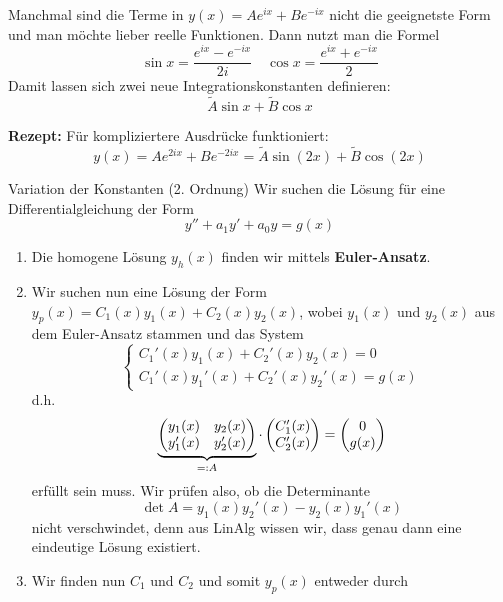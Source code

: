 \begin{Diverses}{}{}
	Manchmal sind die Terme in $y(x) = Ae^{ix} + Be^{-ix}$ nicht die geeignetste Form und man möchte lieber reelle Funktionen. Dann nutzt man die Formel 
	\[
		\sin x = \frac{e^{ix} - e^{-ix}}{2i} \quad
    	\cos x = \frac{e^{ix} + e^{-ix}}{2}
    \]
	Damit lassen sich zwei neue Integrationskonstanten definieren: \[\widetilde{A} \sin x + \widetilde{B} \cos x\]
	
	\textbf{Rezept:} Für kompliziertere Ausdrücke funktioniert:
	\[
	    y(x) = Ae^{2ix} + Be^{-2ix} = \widetilde{A} \sin (2x) + \widetilde{B} \cos (2x)
	\]
\end{Diverses}

\begin{Rezept}{Variation der Konstanten (2. Ordnung)}{}
	Wir suchen die Lösung für eine Differentialgleichung der Form
	\begin{equation*}
	y'' + a_1 y' + a_0 y = g(x)
	\end{equation*}
	\begin{enumerate}
		\item Die homogene Lösung $y_h(x)$ finden wir mittels \textbf{Euler-Ansatz}.
		\item Wir suchen nun eine Lösung der Form $y_p(x) = C_1(x) y_1(x) + C_2(x) y_2(x)$, wobei $y_1(x)$ und $y_2(x)$ aus dem Euler-Ansatz stammen und das System
		\begin{equation*}
		\begin{cases} C_1'(x)y_1(x) + C_2'(x)y_2(x)=0\\C_1'(x)y_1'(x) + C_2'(x)y_2'(x)=g(x)\end{cases}
		\end{equation*}
		d.h.
		\begin{equation*}
		\underbrace{\begin{pmatrix}
			y_1(x) &y_2(x)\\y_1'(x) &y_2'(x)
			\end{pmatrix}}_{=:A} \cdot \begin{pmatrix} C_1'(x) \\ C_2'(x)\end{pmatrix} = \begin{pmatrix} 0 \\ g(x)\end{pmatrix}
		\end{equation*}
		erfüllt sein muss. Wir prüfen also, ob die Determinante
		\begin{equation*}
		\det A = y_1(x)y_2'(x)-y_2(x)y_1'(x)
		\end{equation*}
		nicht verschwindet, denn aus LinAlg wissen wir, dass genau dann eine eindeutige Lösung existiert.
		\item  Wir finden nun $C_1$ und $C_2$ und somit $y_p(x)$ entweder durch
		\begin{enumerate}[(a)]

\end{enumerate}
\end{enumerate}
\end{Rezept}
